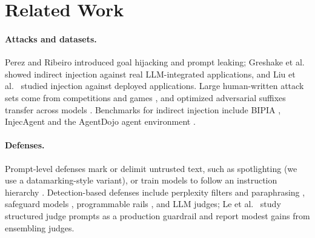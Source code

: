 \documentclass[11pt]{article}
\begin{document}
\section{Related Work}
\paragraph{Attacks and datasets.} Perez and Ribeiro \cite{perez2022ignore} introduced goal hijacking and prompt
leaking; Greshake et al.\ \cite{greshake2023not} showed indirect injection against real LLM-integrated applications,
and Liu et al.\ \cite{liu2023prompt} studied injection against deployed applications. Large human-written attack sets
come from competitions and games \cite{schulhoff2023hackaprompt,toyer2023tensor}, and optimized adversarial suffixes
transfer across models \cite{zou2023universal}. Benchmarks for indirect injection include BIPIA \cite{yi2023bipia},
InjecAgent \cite{zhan2024injecagent} and the AgentDojo agent environment \cite{debenedetti2024agentdojo}.
\paragraph{Defenses.} Prompt-level defenses mark or delimit untrusted text, such as spotlighting
\cite{hines2024spotlighting} (we use a datamarking-style variant), or train models to follow an instruction
hierarchy \cite{wallace2024hierarchy}. Detection-based defenses include perplexity filters and paraphrasing
\cite{jain2023baseline}, safeguard models \cite{inan2023llamaguard}, programmable rails \cite{rebedea2023nemo}, and
LLM judges; Le et al.\ \cite{le2026judge} study structured judge prompts as a production guardrail and report modest
gains from ensembling judges.
\end{document}
